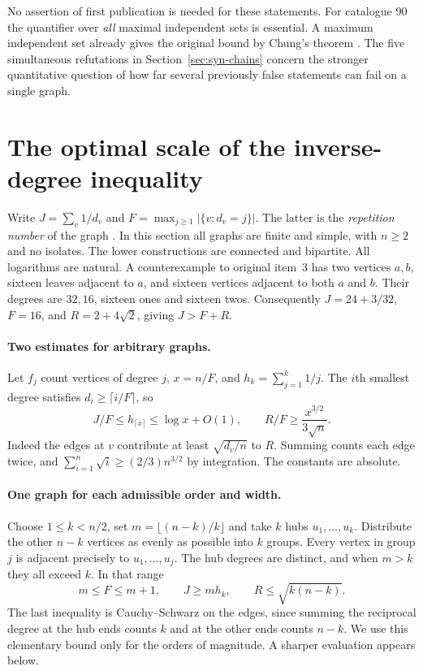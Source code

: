 \documentclass[11pt,a4paper]{article}
\theoremstyle{remark}\newtheorem*{remark}{Remark}
\begin{document}
\medskip\noindent No assertion of first publication is needed for these statements. For catalogue 90 the quantifier over \emph{all} maximal independent sets is essential. A maximum independent set already gives the original bound by Chung's theorem \cite{chung}. The five simultaneous refutations in Section~\ref{sec:syn-chains} concern the stronger quantitative question of how far several previously false statements can fail on a single graph.


\section{The optimal scale of the inverse-degree inequality}
\label{sec:degree-data}
Write $J=\sum_{v}1/d_v$ and $F=\max_{j\ge1}|\{v:d_v=j\}|$. The latter
is the \emph{repetition number} of the graph \cite{degree-caro}. In this
section all graphs are finite and simple, with $n\ge2$ and no isolates.
The lower constructions are connected and bipartite. All logarithms are
natural. A counterexample to original item~3 has two vertices $a,b$,
sixteen leaves adjacent to $a$, and sixteen vertices adjacent to both
$a$ and $b$. Their degrees are $32,16$, sixteen ones and sixteen twos.
Consequently $J=24+3/32$, $F=16$, and $R=2+4\sqrt2$, giving $J>F+R$.

\paragraph{Two estimates for arbitrary graphs.}
Let $f_j$ count vertices of degree $j$, $x=n/F$, and
$h_k=\sum_{j=1}^k 1/j$. The $i$th smallest degree satisfies
$d_i\ge\lceil i/F\rceil$, so
\begin{equation}\label{eq:deg-upper}
 J/F\le h_{\lceil x\rceil}\le\log x+O(1),\qquad
 R/F\ge\frac{x^{3/2}}{3\sqrt n}.
\end{equation}
Indeed the edges at $v$ contribute at least $\sqrt{d_v/n}$ to $R$.
Summing counts each edge twice, and $\sum_{i=1}^n\sqrt i\ge(2/3)n^{3/2}$
by integration. The constants are absolute.

\paragraph{One graph for each admissible order and width.}
Choose $1\le k<n/2$, set $m=\lfloor(n-k)/k\rfloor$ and take $k$ hubs
$u_1,\ldots,u_k$. Distribute the other $n-k$ vertices as evenly as
possible into $k$ groups. Every vertex in group $j$ is adjacent precisely
to $u_1,\ldots,u_j$. The hub degrees are distinct, and when $m>k$ they
all exceed $k$. In that range
\begin{equation}\label{eq:deg-ferrers}
 m\le F\le m+1,\qquad J\ge m h_k,\qquad R\le\sqrt{k(n-k)}.
\end{equation}
The last inequality is Cauchy--Schwarz on the edges, since summing the
reciprocal degree at the hub ends counts $k$ and at the other ends counts
$n-k$. We use this elementary bound only for the orders of magnitude.
A sharper evaluation appears below.
\end{document}
